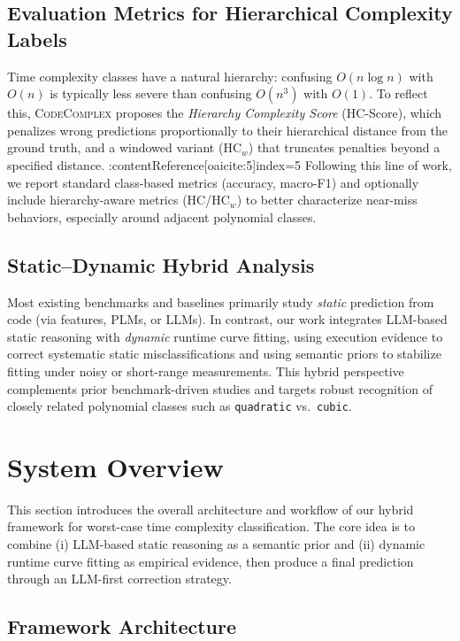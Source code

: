\documentclass[conference]{IEEEtran}
\begin{document}
 \subsection{Evaluation Metrics for Hierarchical Complexity Labels} 
 Time complexity classes have a natural hierarchy: confusing $O(n\log n)$ with $O(n)$ is typically less severe than 
 confusing $O(n^3)$ with $O(1)$. To reflect this, \textsc{CodeComplex} proposes the \emph{Hierarchy Complexity Score} 
 (HC-Score), which penalizes wrong predictions proportionally to their hierarchical distance from the ground truth, 
 and a windowed variant (HC$_w$) that truncates penalties beyond a specified distance. :contentReference[oaicite:5]{index=5} 
 Following this line of work, we report standard class-based metrics (accuracy, macro-F1) and optionally include 
 hierarchy-aware metrics (HC/HC$_w$) to better characterize near-miss behaviors, especially around adjacent polynomial 
 classes. 
 
 \subsection{Static--Dynamic Hybrid Analysis} 
 Most existing benchmarks and baselines primarily study \emph{static} prediction from code (via features, PLMs, or LLMs). 
 In contrast, our work integrates LLM-based static reasoning with \emph{dynamic} runtime curve fitting, using execution 
 evidence to correct systematic static misclassifications and using semantic priors to stabilize fitting under noisy or 
 short-range measurements. This hybrid perspective complements prior benchmark-driven studies and targets robust 
 recognition of closely related polynomial classes such as \texttt{quadratic} vs.\ \texttt{cubic}.

\section{System Overview} 
 \label{sec:system} 
 
 This section introduces the overall architecture and workflow of our hybrid framework for 
 worst-case time complexity classification. The core idea is to combine (i) LLM-based static reasoning 
 as a semantic prior and (ii) dynamic runtime curve fitting as empirical evidence, then produce a final 
 prediction through an LLM-first correction strategy. 
 
 \subsection{Framework Architecture} 
 \label{subsec:architecture} 
 
\end{document}
